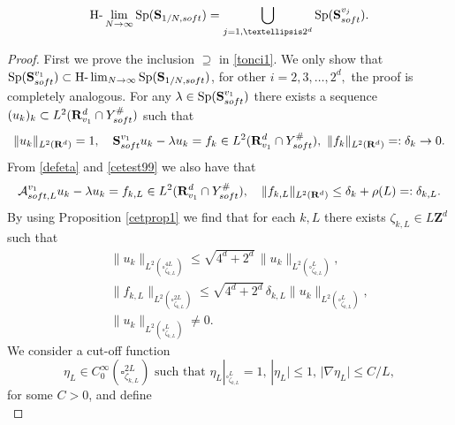 \documentclass[10pt,a4paper]{amsart}
\DeclareMathOperator{\Sp}{Sp}
\def\RR{\R}
\newcommand\soft{{\rm soft}}
\newcommand{\R}{\mathbf{R}}
\renewcommand\AA{{\mathbf S}}
\begin{document}
\begin{theorem} \label{th5.5}
	\begin{equation} \label{tonci1}  \text{H-}\lim_{N \to \infty} \Sp (\AA_{1/N,\soft})=\bigcup_{j=1,\dots 2^d} \mathrm{Sp} (\AA_\soft^{v_j}). \end{equation}
\end{theorem}

\begin{proof}

	First we prove the inclusion $\supseteq$ in \eqref{tonci1}.
	We only show that $\Sp (\AA_\soft ^{v_1})\subset \text{H-}\lim_{N \to \infty} \Sp (\AA_{1/N,\soft})$,  for other $i=2,3,\dots, 2^d,$ the proof is completely analogous.
	For any $\lambda \in \Sp  (\AA_\soft ^{v_1})$ there exists
	a sequence $(u_k)_k \subset L^2(\mathbf{R}^d_{v_1} \cap Y_\soft^{\#})$ such that
	\begin{equation} \label{cetest99}
		\|u_k\|_{L^2(\RR^d)}=1, \quad \AA_\soft ^{v_1} u_k-\lambda u_k=f_k \in L^2(\RR^d_{v_1} \cap Y_\soft^{\#}), \  \|f_k\|_{L^2(\RR^d)}=:\delta_k \to 0. 	
	\end{equation}
	From \eqref{defeta} and  \eqref{cetest99} we also have that
	\begin{equation*} %
		\mathcal{A}_{\rm soft,L}^{v_1} u_k-\lambda u_k=f_{k,L} \in L^2(\RR^d_{v_1} \cap Y_\soft^{\#}), \quad \|f_{k,L}\|_{L^2(\RR^d)} \leq \delta_k +\rho(L)=:\delta_{k,L}.
	\end{equation*}
	By using Proposition \ref{cetprop1}   we find that   for each $k,L$  there exists $\zeta_{k,L} \in L\mathbf{Z}^d$ such that
	\begin{eqnarray}\label{prd6}
		& &\|  u_k\|_{L^2(\square^{4L}_{\zeta_{k,L}})} \leq \sqrt{4^d+  2^d}\, \|  u_k\|_{L^2(\square^{L}_{\zeta_{k,L}})},  \\ \label{utoest23}  & &   \| f_{k,L}\|_{L^2(\square^{2L}_{\zeta_{k,L}})} \leq \sqrt{4^d+  2^d}\, \delta_{k,L} \| u_k\|_{L^2(\square^{L}_{\zeta_{k,L}})}, \\ & & \label{prd8}  \| u_k\|_{L^2(\square^{L}_{\zeta_{k,L}})} \neq 0.
	\end{eqnarray}
		We consider a cut-off function
		\begin{equation}\label{104}
			\eta_L \in C_0^{\infty}(\square^{2L}_{\zeta_{k,L}}) \mbox{ such that } \eta_L|_{\square^L_{\zeta_{k,L}}}=1,\, |\eta_L|\leq 1,\, |\nabla \eta_L|\leq C/L,
		\end{equation}
		for some $C>0$,   and define
	\begin{equation} \label{utoest20}

\end{equation}
\end{proof}
\end{document}
